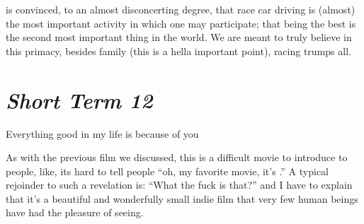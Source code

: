 \documentclass[../philo.tex]{subfiles}
\begin{document}
 is convinced, to an almost disconcerting degree, that race car driving is (almost) the most important activity in which one may participate; that being the best is the second most important thing in the world.
We are meant to truly believe in this primacy, besides family (this is a hella important point), racing trumps all.

\section{\textit{Short Term 12}}
\epigraph{Everything good in my life is because of you}{}

As with the previous film we discussed, this is a difficult movie to introduce to people, like, its hard to tell people ``oh, my favorite movie, it's .''
A typical rejoinder to such a revelation is: ``What the fuck is that?'' and I have to explain that it's a beautiful and wonderfully small indie film that very few human beings have had the pleasure of seeing.
\end{document}
